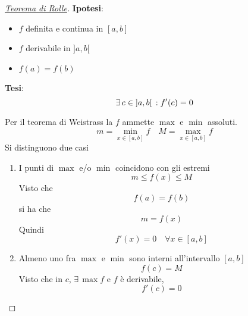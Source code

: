 \begin{proof}[\protect\hyperlink{teor:rolle}{Teorema di Rolle}]
  \textbf{Ipotesi}:
  \begin{itemize}
    \item $f$ definita e continua in $[a,b]$
    \item $f$ derivabile in $]a,b[$
    \item $f(a)=f(b)$
  \end{itemize}
  \textbf{Tesi}:
  \begin{equation*}
    \exists\,c\in{]a,b[}\,: f'(c)=0
  \end{equation*}
  \divisor

  Per il teorema di Weistrass la $f$ ammette $\max$ e $\min$ assoluti.
  \begin{equation*}
    m = \min_{x\in{[a,b]}} f \quad M = \max_{x\in{[a,b]}}f
  \end{equation*}
  Si distinguono due casi
  \begin{enumerate}
    \item I punti di $\max$ e/o $\min$ coincidono con gli estremi
      \begin{equation*}
        m\leq f(x)\leq M
      \end{equation*}
      Visto che
      \begin{equation*}
        f(a) = f(b)
      \end{equation*}
      si ha che
      \begin{equation*}
        m = f(x)
      \end{equation*}
      Quindi
      \begin{equation*}
        f'(x) = 0\quad\forall x \in{[a,b]}
      \end{equation*}
    \item Almeno uno fra $\max$ e $\min$ sono interni all'intervallo ${[a,b]}$
      \begin{equation*}
        f(c) = M
      \end{equation*}
      Visto che in $c$, $\exists\,\max f$ e $f$ è derivabile,
      \begin{equation*}
        f'(c) = 0
      \end{equation*}
  \end{enumerate}
\end{proof}

